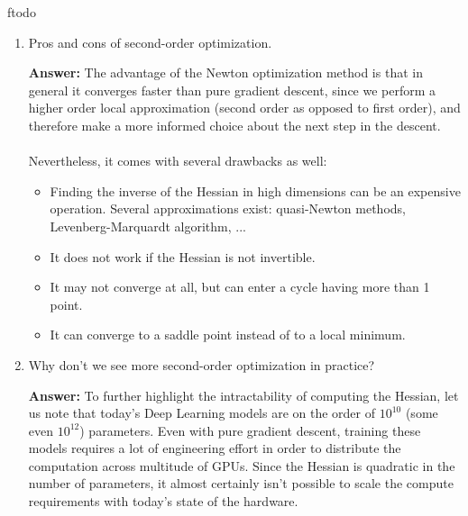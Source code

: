 ƒtodo\documentclass{article}
\newenvironment{QandA}{\begin{enumerate}[label=\arabic*.]}{\end{enumerate}}
\newenvironment{InnerQandA}{\begin{enumerate}[label=\roman*.]}{\end{enumerate}}
\newenvironment{answer}{\par\normalfont \textbf{Answer:}}{}
\begin{document}
\begin{QandA}
\begin{InnerQandA}
        \item Pros and cons of second-order optimization.
        \begin{answer}
            The advantage of the Newton optimization method is that in general it converges faster than pure gradient descent, since we perform a higher order local approximation (second order as opposed to first order), and therefore make a more informed choice about the next step in the descent. \\\\
            Nevertheless, it comes with several drawbacks as well:
            \begin{itemize}
                \item Finding the inverse of the Hessian in high dimensions can be an expensive operation. Several approximations exist: quasi-Newton methods, Levenberg-Marquardt algorithm, ...
                \item It does not work if the Hessian is not invertible.
                \item It may not converge at all, but can enter a cycle having more than 1 point.
                \item It can converge to a saddle point instead of to a local minimum.
            \end{itemize}
        \end{answer}

        \item Why don’t we see more second-order optimization in practice?
        \begin{answer}
            To further highlight the intractability of computing the Hessian, let us note that today's Deep Learning models are on the order of $10^{10}$ (some even $10^{12}$) parameters. Even with pure gradient descent, training these models requires a lot of engineering effort in order to distribute the computation across multitude of GPUs. Since the Hessian is quadratic in the number of parameters, it almost certainly isn't possible to scale the compute requirements with today's state of the hardware.
        \end{answer}

    \end{InnerQandA}


\end{QandA}
\end{document}
